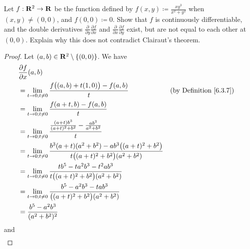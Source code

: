 \exercisesection

\begin{exercise}\label{ex 6.5.1}
    Let \(f : \mathbf{R}^2 \to \mathbf{R}\) be the function defined by \(f(x, y) \coloneqq \frac{x y^3}{x^2 + y^2}\) when \((x, y) \neq (0, 0)\), and \(f(0, 0) \coloneqq 0\).
    Show that \(f\) is continuously differentiable, and the double derivatives \(\frac{\partial}{\partial y} \frac{\partial f}{\partial x}\) and \(\frac{\partial}{\partial x} \frac{\partial f}{\partial y}\) exist, but are not equal to each other at \((0, 0)\).
    Explain why this does not contradict Clairaut's theorem.
\end{exercise}

\begin{proof}
    Let \((a, b) \in \mathbf{R}^2 \setminus \{(0, 0)\}\).
    We have
    \begin{align*}
         & \frac{\partial f}{\partial x}(a, b)                                                                                                                                        \\
         & = \lim_{t \to 0 ; t \neq 0} \frac{f\big((a, b) + t(1, 0)\big) - f(a, b)}{t}                                                           & \text{(by Definition \ref{6.3.7})} \\
         & = \lim_{t \to 0 ; t \neq 0} \frac{f(a + t, b) - f(a, b)}{t}                                                                                                                \\
         & = \lim_{t \to 0 ; t \neq 0} \frac{\frac{(a + t) b^3}{(a + t)^2 + b^2} - \frac{ab^3}{a^2 + b^2}}{t}                                                                         \\
         & = \lim_{t \to 0 ; t \neq 0} \frac{b^3 (a + t) (a^2 + b^2) - a b^3 \big((a + t)^2 + b^2\big)}{t \big((a + t)^2 + b^2\big) (a^2 + b^2)}                                      \\
         & = \lim_{t \to 0 ; t \neq 0} \frac{t b^5 - t a^2 b^3 - t^2 a b^3}{t \big((a + t)^2 + b^2\big) (a^2 + b^2)}                                                                  \\
         & = \lim_{t \to 0 ; t \neq 0} \frac{b^5 - a^2 b^3 - t a b^3}{\big((a + t)^2 + b^2\big) (a^2 + b^2)}                                                                          \\
         & = \frac{b^5 - a^2 b^3}{(a^2 + b^2)^2}
    \end{align*}
    and
    \begin{align*}

\end{align*}
\end{proof}
